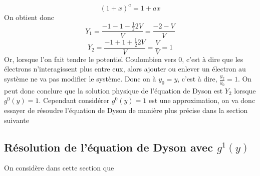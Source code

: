 \documentclass[12pt]{article}
\begin{document}
\begin{equation}
 (1 + x)^a = 1 + ax 
\end{equation}
On obtient donc 
\begin{equation}
 Y_1 = \frac{-1 -1 - \frac{1}{2} 2 V }{V} =\frac{-2 -V}{V}
\end{equation}
\begin{equation}
 Y_2 = \frac{-1 + 1 +\frac{1}{2}2V }{V} = \frac{V}{V} = 1
\end{equation}
Or, lorsque l'on fait tendre le potentiel Coulombien vers 0, c'est \`a dire que les \'electrons n'interagissent plus entre eux, alors ajouter ou enlever un \'electron au syst\`eme ne va pas modifier le syst\`eme. Donc on \`a $y_0 = y$, c'est à dire, $\frac{y_2}{y_0} = 1$.
On peut donc conclure que la solution physique de l'\'equation de Dyson est $Y_2$ lorsque $g^0(y) = 1$.
\newline
Cependant consid\'erer $g^0(y) = 1$ est une approximation, on va donc essayer de r\'esoudre l'\'equation de Dyson de mani\`ere plus pr\'ecise dans la section suivante

\subsection{R\'esolution de l'\'equation de Dyson avec $g^1(y)$}
On consid\`ere dans cette section que 
\end{document}

